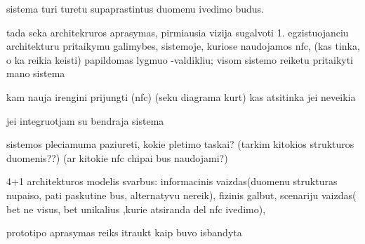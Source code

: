 sistema turi turetu supaprastintus duomenu ivedimo budus.



tada seka architekruros aprasymas, pirmiausia vizija sugalvoti
1. egzistuojanciu architekturu pritaikymu galimybes, sistemoje, kuriose naudojamos nfc, (kas tinka, o ka reikia keisti) papildomas lygmuo -valdikliu;
visom sistemo reiketu pritaikyti mano sistema

kam nauja irengini prijungti (nfc) (seku diagrama kurt) kas atsitinka jei neveikia

jei integruotjam su bendraja sistema


sistemos pleciamuma paziureti, kokie pletimo taskai? (tarkim kitokios strukturos duomenis??) (ar kitokie nfc chipai bus naudojami?)


4+1 architekturos modelis
svarbus: informacinis vaizdas(duomenu strukturas nupaiso, pati paskutine bus, alternatyvu nereik), fizinis galbut, scenariju vaizdas( bet ne visus, bet unikalius ,kurie atsiranda del nfc ivedimo), 



prototipo aprasymas reiks itraukt kaip buvo isbandyta




